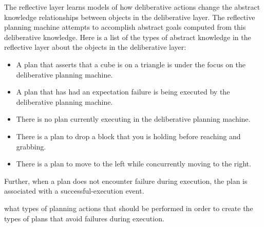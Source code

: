 The reflective layer learns models of how deliberative actions change
the abstract knowledge relationships between objects in the
deliberative layer.  The reflective planning machine attempts to
accomplish abstract goals computed from this deliberative knowledge.
Here is a list of the types of abstract knowledge in the reflective
layer about the objects in the deliberative layer:
\begin{itemize}
\item A plan that asserts that a cube is on a triangle is under the
  focus on the deliberative planning machine.
\item A plan that has had an expectation failure is being executed by
  the deliberative planning machine.
\item There is no plan currently executing in the deliberative
  planning machine.
\item There is a plan to drop a block that you is holding before
  reaching and grabbing.
\item There is a plan to move to the left while concurrently moving to
  the right.
\end{itemize}


Further, when a plan does not encounter failure during execution, the
plan is associated with a successful-execution event.

     what types of planning
actions that should be performed in order to create the types of plans
that avoid failures during execution.

